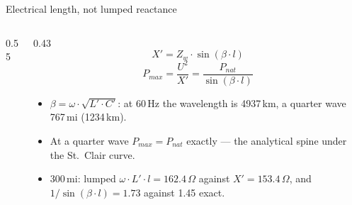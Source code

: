 \begin{frame}{Electrical length, not lumped reactance}
  \begin{columns}[c,onlytextwidth]
    \begin{column}{0.55\textwidth}\centering
    \end{column}
    \begin{column}{0.43\textwidth}
      \setlength{\abovedisplayskip}{3pt}\setlength{\belowdisplayskip}{5pt}
      \[ X' = Z_w\cdot\sin\left(\beta\cdot l\right) \]
      \[ P_{max} = \frac{U^2}{X'}
                 = \frac{P_{nat}}{\sin\left(\beta\cdot l\right)} \]
      {\footnotesize
      \begin{itemize}
        \setlength{\itemsep}{0.35em}
        \item $\beta=\omega\cdot\sqrt{L'\cdot C'}$: at 60\,Hz the
              wavelength is 4937\,km, a quarter wave 767\,mi (1234\,km).
        \item At a quarter wave $P_{max}=P_{nat}$ exactly --- the
              analytical spine under the St.~Clair curve.
        \item 300\,mi: lumped $\omega\cdot L'\cdot l=162.4\,\Omega$
              against $X'=153.4\,\Omega$, and $1/\sin\left(\beta\cdot l\right)
              =1.73$ against 1.45 exact.
      \end{itemize}}
    \end{column}
  \end{columns}
\end{frame}


